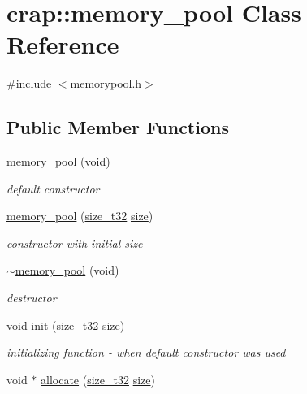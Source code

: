 \hypertarget{classcrap_1_1memory__pool}{\section{crap\-:\-:memory\-\_\-pool Class Reference}
\label{classcrap_1_1memory__pool}
}


{\ttfamily \#include $<$memorypool.\-h$>$}

\subsection*{Public Member Functions}
\begin{DoxyCompactItemize}
\item 
\hyperlink{classcrap_1_1memory__pool_a1737ff4849d880063e5e29149753b16c}{memory\-\_\-pool} (void)
\begin{DoxyCompactList}\small\item\em default constructor \end{DoxyCompactList}\item 
\hyperlink{classcrap_1_1memory__pool_a66bd906710927e8e3c3ad66003eae84d}{memory\-\_\-pool} (\hyperlink{types_8h_a38c0a12279ffe0fabec44939e753c914}{size\-\_\-t32} \hyperlink{classcrap_1_1memory__pool_adb17e01142872367d7451c4e9ce19cef}{size})
\begin{DoxyCompactList}\small\item\em constructor with initial size \end{DoxyCompactList}\item 
\hyperlink{classcrap_1_1memory__pool_ac9c5827710ea2e286081ccf215de18c8}{$\sim$memory\-\_\-pool} (void)
\begin{DoxyCompactList}\small\item\em destructor \end{DoxyCompactList}\item 
void \hyperlink{classcrap_1_1memory__pool_a406348dc0a371f3a524d109f2a7e00f4}{init} (\hyperlink{types_8h_a38c0a12279ffe0fabec44939e753c914}{size\-\_\-t32} \hyperlink{classcrap_1_1memory__pool_adb17e01142872367d7451c4e9ce19cef}{size})
\begin{DoxyCompactList}\small\item\em initializing function -\/ when default constructor was used \end{DoxyCompactList}\item 
void $\ast$ \hyperlink{classcrap_1_1memory__pool_aae96e27b836c75fa42ad3a9973726553}{allocate} (\hyperlink{types_8h_a38c0a12279ffe0fabec44939e753c914}{size\-\_\-t32} \hyperlink{classcrap_1_1memory__pool_adb17e01142872367d7451c4e9ce19cef}{size})

\end{DoxyCompactItemize}
